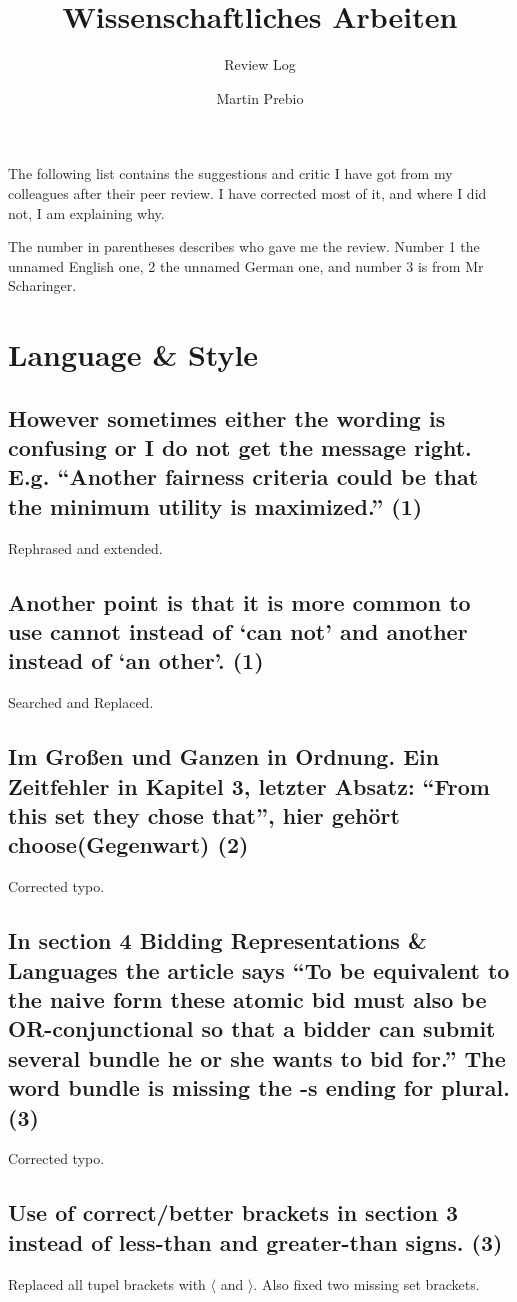 \documentclass{"../../Datenanalyse/assignments/latex-brookesassignment/brookes-assignment"}
\author{Martin Prebio}
\title{Wissenschaftliches Arbeiten}
\subtitle{Review Log}
\begin{document}
\maketitle

The following list contains the suggestions and critic I have got from my colleagues after their peer review. I have corrected most of it, and where I did not, I am explaining why.

The number in parentheses describes who gave me the review. Number 1 the unnamed English one, 2 the unnamed German one, and number 3 is from Mr Scharinger.

\section{Language \& Style}
\subsection{However sometimes either the wording is confusing or I do not get the message right. E.g. ``Another fairness criteria could be that the minimum utility is maximized.'' (1)}
Rephrased and extended.
\subsection{Another point is that it is more common to use cannot instead of `can not' and another instead of `an other'. (1)}
Searched and Replaced.
\subsection{Im Großen und Ganzen in Ordnung. Ein Zeitfehler in Kapitel 3, letzter Absatz: ``From this set they chose that'', hier gehört choose(Gegenwart) (2)}
Corrected typo.
\subsection{In section 4 Bidding Representations \& Languages the article says ``To be equivalent to the naive form these atomic bid must also be OR-conjunctional so that a bidder can submit several bundle he or she wants to bid for.'' The word bundle is missing the -s ending for plural. (3)}
Corrected typo.
\subsection{Use of correct/better brackets in section 3 instead of less-than and greater-than signs. (3)}
Replaced all tupel brackets with $\langle$ and $\rangle$. Also fixed two missing set brackets.
\end{document}
